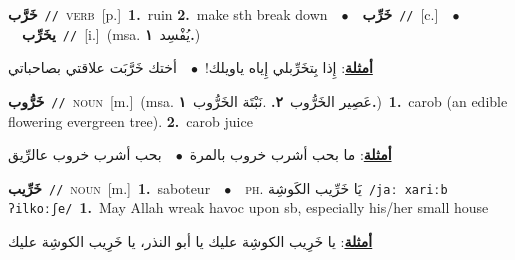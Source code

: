\documentclass[10pt,a4paper,twoside]{article} %
\begin{document}
\begin{multicols}{2}
{\setlength\topsep{0pt}\textbf{\foreignlanguage{arabic}{خَرَّب}}\ {\color{gray}\texttt{//}\color{black}}\ \textsc{verb}\ [p.]\ \textbf{1.}~ruin  \textbf{2.}~make sth break down\ \ $\bullet$\ \ \setlength\topsep{0pt}\textbf{\foreignlanguage{arabic}{خَرِّب}}\ {\color{gray}\texttt{//}\color{black}}\ [c.]\ \ $\bullet$\ \ \setlength\topsep{0pt}\textbf{\foreignlanguage{arabic}{يخَرِّب}}\ {\color{gray}\texttt{//}\color{black}}\ [i.]\ \color{gray}(msa. \foreignlanguage{arabic}{يُفْسِد}~\foreignlanguage{arabic}{\textbf{١.}})\color{black}\  \begin{flushright}\color{gray}\foreignlanguage{arabic}{\textbf{\underline{\foreignlanguage{arabic}{أمثلة}}}: إِذا بِتخَرِّبلي إِياه ياويلك!\ $\bullet$\ \  أختك خَرَّبَت علاقتي بصاحباتي}\end{flushright}\color{black}} \vspace{2mm}

{\setlength\topsep{0pt}\textbf{\foreignlanguage{arabic}{خَرُّوب}}\ {\color{gray}\texttt{//}\color{black}}\ \textsc{noun}\ [m.]\ \color{gray}(msa. \foreignlanguage{arabic}{عَصِير الخَرُّوب}~\foreignlanguage{arabic}{\textbf{٢.}}  .\foreignlanguage{arabic}{نَبْتَة الخَرُّوب}~\foreignlanguage{arabic}{\textbf{١.}})\color{black}\ \textbf{1.}~carob (an edible flowering evergreen tree).  \textbf{2.}~carob juice\  \begin{flushright}\color{gray}\foreignlanguage{arabic}{\textbf{\underline{\foreignlanguage{arabic}{أمثلة}}}: ما بحب أشرب خروب بالمرة\ $\bullet$\ \  بحب أشرب خروب عالرِّيق}\end{flushright}\color{black}} \vspace{2mm}

{\setlength\topsep{0pt}\textbf{\foreignlanguage{arabic}{خَرِّيب}}\ {\color{gray}\texttt{//}\color{black}}\ \textsc{noun}\ [m.]\ \textbf{1.}~saboteur\ \ $\bullet$\ \ \textsc{ph.} \color{gray} \foreignlanguage{arabic}{يَا خَرِّيب الكَوشِة}\color{black}\ {\color{gray}\texttt{/{\sffamily jaː xariːb ʔilkoːʃe}/}\color{black}}\ \textbf{1.}~May Allah wreak havoc upon sb, especially his/her small house\  \begin{flushright}\color{gray}\foreignlanguage{arabic}{\textbf{\underline{\foreignlanguage{arabic}{أمثلة}}}: يا خَرِيب الكوشِة عليك يا أبو النذر، يا خَرِيب الكوشِة عليك}\end{flushright}\color{black}} \vspace{2mm}


\end{multicols}
\end{document}

